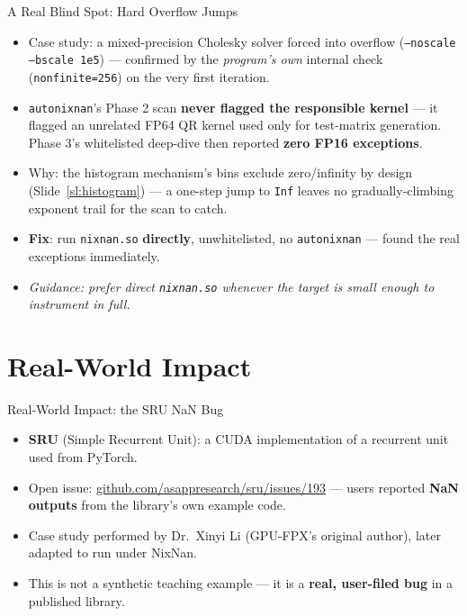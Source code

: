 \documentclass[aspectratio=169,11pt]{beamer}
\begin{document}
\begin{frame}{A Real Blind Spot: Hard Overflow Jumps}
\label{sl:blindspot}
\begin{itemize}
  \item Case study: a mixed-precision Cholesky solver forced into overflow
    (\texttt{--noscale --bscale 1e5}) --- confirmed by the \emph{program's
    own} internal check (\texttt{nonfinite=256}) on the very first iteration.
  \item \texttt{autonixnan}'s Phase 2 scan \textbf{never flagged the
    responsible kernel} --- it flagged an unrelated FP64 QR kernel used only
    for test-matrix generation. Phase 3's whitelisted deep-dive then reported
    \textbf{zero FP16 exceptions}.
  \item Why: the histogram mechanism's bins exclude zero/infinity by design
    (Slide~\ref{sl:histogram}) --- a one-step jump to \texttt{Inf} leaves no
    gradually-climbing exponent trail for the scan to catch.
  \item \textbf{Fix}: run \texttt{nixnan.so} \textbf{directly}, unwhitelisted,
    no \texttt{autonixnan} --- found the real exceptions immediately.
  \item \textit{Guidance: prefer direct \texttt{nixnan.so} whenever the target
    is small enough to instrument in full.}
\end{itemize}
\end{frame}

\section{Real-World Impact}

\begin{frame}{Real-World Impact: the SRU NaN Bug}
\begin{itemize}
  \item \textbf{SRU} (Simple Recurrent Unit): a CUDA implementation of a
    recurrent unit used from PyTorch.
  \item Open issue: \url{github.com/asappresearch/sru/issues/193} --- users
    reported \textbf{NaN outputs} from the library's own example code.
  \item Case study performed by Dr.\ Xinyi Li (GPU-FPX's original author),
    later adapted to run under NixNan.
  \item This is not a synthetic teaching example --- it is a \textbf{real,
    user-filed bug} in a published library.
\end{itemize}
\end{frame}
\end{document}
